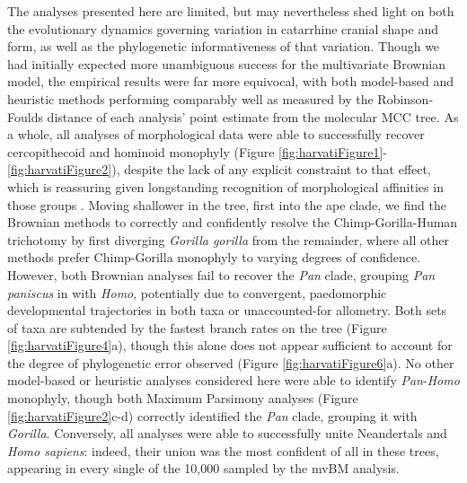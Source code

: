 The analyses presented here are limited, but may nevertheless shed light on both the evolutionary dynamics governing variation in catarrhine cranial shape and form, as well as the phylogenetic informativeness of that variation. Though we had initially expected more unambiguous success for the multivariate Brownian model, the empirical results were far more equivocal, with both model-based and heuristic methods performing comparably well as measured by the Robinson-Foulds distance of each analysis' point estimate from the molecular MCC tree. As a whole, all analyses of morphological data were able to successfully recover cercopithecoid and hominoid monophyly (Figure \ref{fig:harvatiFigure1}-\ref{fig:harvatiFigure2}), despite the lack of any explicit constraint to that effect, which is reassuring given longstanding recognition of morphological affinities in those groups \citep{darwinDescentManSelection1896}. Moving shallower in the tree, first into the ape clade, we find the Brownian methods to correctly and confidently resolve the Chimp-Gorilla-Human trichotomy \citep{bradleyReconstructingPhylogeniesPhenotypes2008} by first diverging \textit{Gorilla gorilla} from the remainder, where all other methods prefer Chimp-Gorilla monophyly to varying degrees of confidence. However, both Brownian analyses fail to recover the \textit{Pan} clade, grouping \textit{Pan paniscus} in with \textit{Homo}, potentially due to convergent, paedomorphic developmental trajectories in both taxa \citep{sheaPaedomorphosisNeotenyPygmy1983, williamsDiagnosingHeterochronicPerturbations2001} or unaccounted-for allometry. Both sets of taxa are subtended by the fastest branch rates on the tree (Figure \ref{fig:harvatiFigure4}a), though this alone does not appear sufficient to account for the degree of phylogenetic error observed (Figure \ref{fig:harvatiFigure6}a). No other model-based or heuristic analyses considered here were able to identify \textit{Pan}-\textit{Homo} monophyly, though both Maximum Parsimony analyses (Figure \ref{fig:harvatiFigure2}c-d) correctly identified the \textit{Pan} clade, grouping it with \textit{Gorilla}. Conversely, all analyses were able to successfully unite Neandertals and \textit{Homo sapiens}: indeed, their union was the most confident of all in these trees, appearing in every single of the 10,000 sampled by the mvBM analysis.

